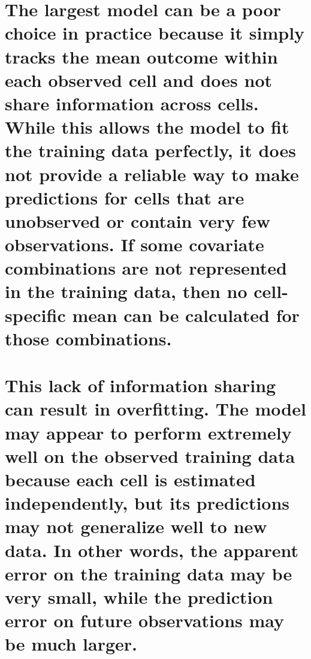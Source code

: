\documentclass[
  letterpaper,
  DIV=11,
  numbers=noendperiod]{scrreprt}
\begin{document}
{\chapter{The largest model can be a poor choice in practice because it
simply tracks the mean outcome within each observed cell and does not
share information across cells. While this allows the model to fit the
training data perfectly, it does not provide a reliable way to make
predictions for cells that are unobserved or contain very few
observations. If some covariate combinations are not represented in the
training data, then no cell-specific mean can be calculated for those
combinations.}\label{the-largest-model-can-be-a-poor-choice-in-practice-because-it-simply-tracks-the-mean-outcome-within-each-observed-cell-and-does-not-share-information-across-cells.-while-this-allows-the-model-to-fit-the-training-data-perfectly-it-does-not-provide-a-reliable-way-to-make-predictions-for-cells-that-are-unobserved-or-contain-very-few-observations.-if-some-covariate-combinations-are-not-represented-in-the-training-data-then-no-cell-specific-mean-can-be-calculated-for-those-combinations.}


\chapter{This lack of information sharing can result in overfitting. The
model may appear to perform extremely well on the observed training data
because each cell is estimated independently, but its predictions may
not generalize well to new data. In other words, the apparent error on
the training data may be very small, while the prediction error on
future observations may be much
larger.}\label{this-lack-of-information-sharing-can-result-in-overfitting.-the-model-may-appear-to-perform-extremely-well-on-the-observed-training-data-because-each-cell-is-estimated-independently-but-its-predictions-may-not-generalize-well-to-new-data.-in-other-words-the-apparent-error-on-the-training-data-may-be-very-small-while-the-prediction-error-on-future-observations-may-be-much-larger.}


}
\end{document}
